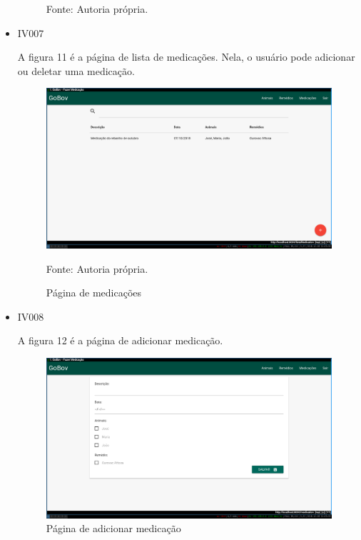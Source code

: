 \begin{itemize}
\begin{figure}[H]
\begin{center}
		Fonte: Autoria própria.
	\end{center}
\end{figure}


\item IV007

A figura 11 é a página de lista de medicações. Nela, o usuário pode adicionar ou deletar uma medicação.
\begin{figure}[H]
	\begin{center}
		\caption{Página de medicações}
		\includegraphics[width=\textwidth]{../img/prototipos/listaMedicacao.png}

		Fonte: Autoria própria.
	\end{center}
\end{figure}

\item IV008

A figura 12 é a página de adicionar medicação.
\begin{figure}[H]
	\begin{center}
		\caption{Página de adicionar medicação}
		\includegraphics[width=\textwidth]{../img/prototipos/addMedicacao.png}


\end{center}
\end{figure}
\end{itemize}
